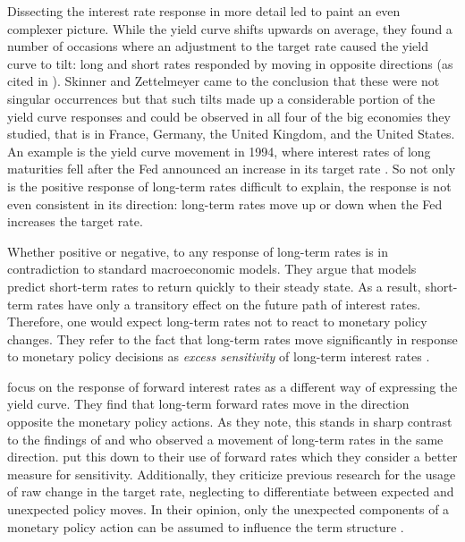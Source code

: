 \documentclass[11pt,a4paper,english,oneside]{book}
\numberwithin{equation}{chapter}
\begin{document}
Dissecting the interest rate response in more detail led \cite{Skinner.1995} to paint an even complexer picture. While the yield curve shifts upwards on average, they found a number of occasions where an adjustment to the target rate caused the yield curve to tilt: long and short rates responded by moving in opposite directions (as cited in \citealp[p. 1]{Ellingsen.2003}). Skinner and Zettelmeyer came to the conclusion that these were not singular occurrences but that such tilts made up a considerable portion of the yield curve responses and could be observed in all four of the big economies they studied, that is in France, Germany, the United Kingdom, and the United States. An example is the yield curve movement in 1994, where interest rates of long maturities fell after the Fed announced an increase in its target rate \citep[~p. 1594]{Ellingsen.2001}. So not only is the positive response of long-term rates difficult to explain, the response is not even consistent in its direction: long-term rates move up or down when the Fed increases the target rate. 

Whether positive or negative, to \citet[p. 425]{Gurkaynak.2005} any response of long-term rates is in contradiction to standard macroeconomic models. They argue that models predict short-term rates to return quickly to their steady state. As a result, short-term rates have only a transitory effect on the future path of interest rates. Therefore, one would expect long-term rates not to react to monetary policy changes. They refer to the fact that long-term rates move significantly in response to monetary policy decisions as \textit{excess sensitivity} of long-term interest rates \cite[p. 2]{Gurkaynak.2003}.

\citet[pp. 426--427]{Gurkaynak.2005} focus on the response of forward interest rates as a different way of expressing the yield curve. They find that long-term forward rates move in the direction opposite the monetary policy actions. As they note, this stands in sharp contrast to the findings of \cite{Cook.1989} and \cite{Romer.2000} who observed a movement of long-term rates in the same direction. \cite{Gurkaynak.2005} put this down to their use of forward rates which they consider a better measure for sensitivity. %
Additionally, they criticize previous research for the usage of raw change in the target rate, neglecting to differentiate between expected and unexpected policy moves. In their opinion, only the unexpected components of a monetary policy action can be assumed to influence the term structure \citep[pp. 430--431]{Gurkaynak.2005}.
\end{document}
